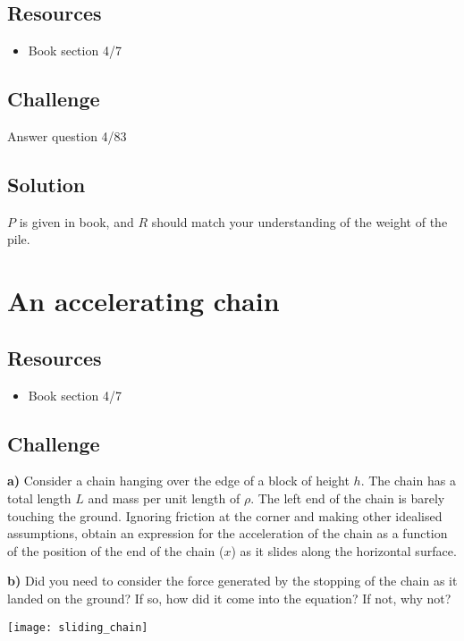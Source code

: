 \subsection*{Resources}
\begin{itemize}
    \item Book section 4/7
\end{itemize}

\subsection*{Challenge}
Answer question 4/83

\subsection*{Solution}
$P$ is given in book, and $R$ should match your understanding of the weight of the pile.




\newpage
\section{An accelerating chain}

\subsection*{Resources}
\begin{itemize}
    \item Book section 4/7
\end{itemize}

\subsection*{Challenge}
\textbf{a)} Consider a chain hanging over the edge of a block of height $h$.  The chain has a total length $L$ and mass per unit length of $\rho$. The left end of the chain is barely touching the ground. Ignoring friction at the corner and making other idealised assumptions, obtain an expression for the acceleration of the chain as a function of the position of the end of the chain ($x$) as it slides along the horizontal surface.

\textbf{b)} Did you need to consider the force generated by the stopping of the chain as it landed on the ground? If so, how did it come into the equation? If not, why not?

\texttt{[image: sliding\_chain]}

